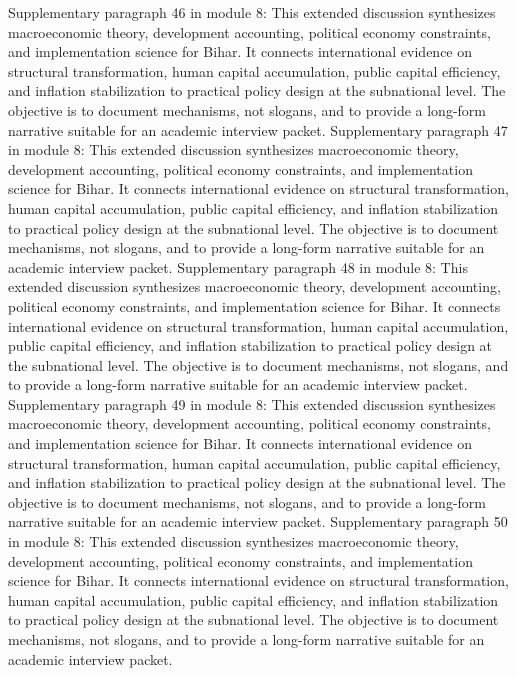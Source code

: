 \documentclass[preprint,12pt]{elsarticle}
\begin{document}
Supplementary paragraph 46 in module 8: This extended discussion synthesizes macroeconomic theory, development accounting, political economy constraints, and implementation science for Bihar. It connects international evidence on structural transformation, human capital accumulation, public capital efficiency, and inflation stabilization to practical policy design at the subnational level. The objective is to document mechanisms, not slogans, and to provide a long-form narrative suitable for an academic interview packet.
Supplementary paragraph 47 in module 8: This extended discussion synthesizes macroeconomic theory, development accounting, political economy constraints, and implementation science for Bihar. It connects international evidence on structural transformation, human capital accumulation, public capital efficiency, and inflation stabilization to practical policy design at the subnational level. The objective is to document mechanisms, not slogans, and to provide a long-form narrative suitable for an academic interview packet.
Supplementary paragraph 48 in module 8: This extended discussion synthesizes macroeconomic theory, development accounting, political economy constraints, and implementation science for Bihar. It connects international evidence on structural transformation, human capital accumulation, public capital efficiency, and inflation stabilization to practical policy design at the subnational level. The objective is to document mechanisms, not slogans, and to provide a long-form narrative suitable for an academic interview packet.
Supplementary paragraph 49 in module 8: This extended discussion synthesizes macroeconomic theory, development accounting, political economy constraints, and implementation science for Bihar. It connects international evidence on structural transformation, human capital accumulation, public capital efficiency, and inflation stabilization to practical policy design at the subnational level. The objective is to document mechanisms, not slogans, and to provide a long-form narrative suitable for an academic interview packet.
Supplementary paragraph 50 in module 8: This extended discussion synthesizes macroeconomic theory, development accounting, political economy constraints, and implementation science for Bihar. It connects international evidence on structural transformation, human capital accumulation, public capital efficiency, and inflation stabilization to practical policy design at the subnational level. The objective is to document mechanisms, not slogans, and to provide a long-form narrative suitable for an academic interview packet.
\end{document}
